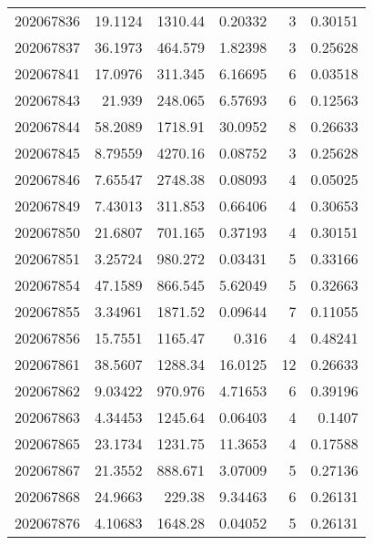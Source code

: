 \begin{tabular}{rrrrrr}
 202067836 &         19.1124  &     1310.44   &            0.20332 &           3 & 0.30151 \\
 202067837 &         36.1973  &      464.579  &            1.82398 &           3 & 0.25628 \\
 202067841 &         17.0976  &      311.345  &            6.16695 &           6 & 0.03518 \\
 202067843 &         21.939   &      248.065  &            6.57693 &           6 & 0.12563 \\
 202067844 &         58.2089  &     1718.91   &           30.0952  &           8 & 0.26633 \\
 202067845 &          8.79559 &     4270.16   &            0.08752 &           3 & 0.25628 \\
 202067846 &          7.65547 &     2748.38   &            0.08093 &           4 & 0.05025 \\
 202067849 &          7.43013 &      311.853  &            0.66406 &           4 & 0.30653 \\
 202067850 &         21.6807  &      701.165  &            0.37193 &           4 & 0.30151 \\
 202067851 &          3.25724 &      980.272  &            0.03431 &           5 & 0.33166 \\
 202067854 &         47.1589  &      866.545  &            5.62049 &           5 & 0.32663 \\
 202067855 &          3.34961 &     1871.52   &            0.09644 &           7 & 0.11055 \\
 202067856 &         15.7551  &     1165.47   &            0.316   &           4 & 0.48241 \\
 202067861 &         38.5607  &     1288.34   &           16.0125  &          12 & 0.26633 \\
 202067862 &          9.03422 &      970.976  &            4.71653 &           6 & 0.39196 \\
 202067863 &          4.34453 &     1245.64   &            0.06403 &           4 & 0.1407  \\
 202067865 &         23.1734  &     1231.75   &           11.3653  &           4 & 0.17588 \\
 202067867 &         21.3552  &      888.671  &            3.07009 &           5 & 0.27136 \\
 202067868 &         24.9663  &      229.38   &            9.34463 &           6 & 0.26131 \\
 202067876 &          4.10683 &     1648.28   &            0.04052 &           5 & 0.26131 \\

\end{tabular}
